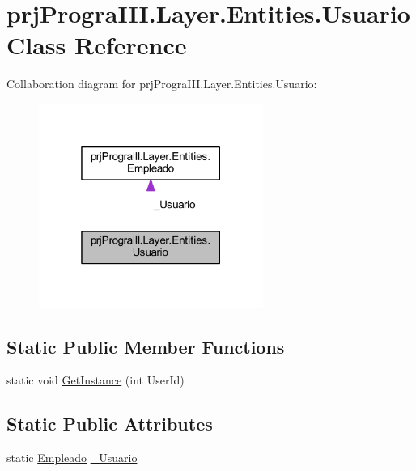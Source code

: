 \hypertarget{classprj_progra_i_i_i_1_1_layer_1_1_entities_1_1_usuario}{}\section{prj\+Progra\+I\+I\+I.\+Layer.\+Entities.\+Usuario Class Reference}
\label{classprj_progra_i_i_i_1_1_layer_1_1_entities_1_1_usuario}


Collaboration diagram for prj\+Progra\+I\+I\+I.\+Layer.\+Entities.\+Usuario\+:
\nopagebreak
\begin{figure}[H]
\begin{center}
\leavevmode
\includegraphics[width=208pt]{classprj_progra_i_i_i_1_1_layer_1_1_entities_1_1_usuario__coll__graph}
\end{center}
\end{figure}
\subsection*{Static Public Member Functions}
\begin{DoxyCompactItemize}
\item 
static void \hyperlink{classprj_progra_i_i_i_1_1_layer_1_1_entities_1_1_usuario_a54df50298c6cc60b0b8a6843f5c88d83}{Get\+Instance} (int User\+Id)
\end{DoxyCompactItemize}
\subsection*{Static Public Attributes}
\begin{DoxyCompactItemize}
\item 
static \hyperlink{classprj_progra_i_i_i_1_1_layer_1_1_entities_1_1_empleado}{Empleado} \hyperlink{classprj_progra_i_i_i_1_1_layer_1_1_entities_1_1_usuario_a5b6c5d7568f24956ae28af40c3e01d44}{\+\_\+\+Usuario}
\end{DoxyCompactItemize}



